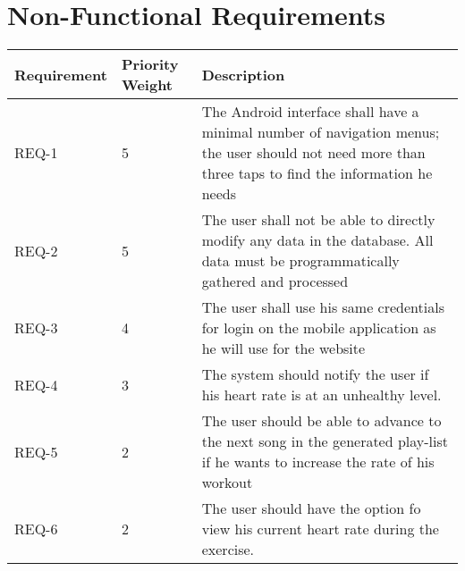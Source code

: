 \documentclass{article}
\begin{document}
\section{Non-Functional Requirements}

\begin{center}
	\begin{tabular}{|C{2cm}|C{2cm}|C{8cm}|}
		\hline
			Requirement & Priority Weight & Description \\
		\hline
			REQ-1 & 5 & The Android interface shall have a minimal number of navigation menus; the user should not need more than three taps to find the information he needs \\
		\hline
			REQ-2 & 5 & The user shall not be able to directly modify any data in the database. All data must be programmatically gathered and processed \\
		\hline
			REQ-3 & 4 & The user shall use his same credentials for login on the mobile application as he will use for the website \\
		\hline
			REQ-4 & 3 & The system should notify the user if his heart rate is at an unhealthy level. \\
		\hline
			REQ-5 & 2 & The user should be able to advance to the next song in the generated play-list if he wants to increase the rate of his workout \\
		\hline	
			REQ-6 & 2 & The user should have the option fo view his current heart rate during the exercise. \\ 
		\hline
	\end{tabular}
\end{center}
\end{document}

